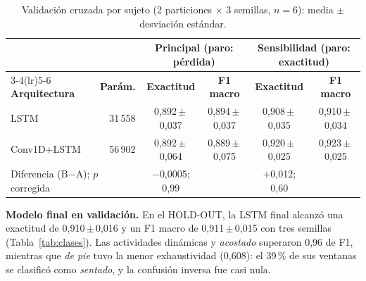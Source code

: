 \documentclass[runningheads]{llncs}
\newcommand{\pmv}[2]{#1\,{\scriptsize$\pm$\,#2}}   %
\begin{document}
\begin{table}[!b]
\centering
\caption{Validación cruzada por sujeto (2 particiones $\times$ 3 semillas, $n=6$):
media $\pm$ desviación estándar.}\label{tab:cv}
\footnotesize
\begin{tabular}{lrcccc}
\toprule
 & & \multicolumn{2}{c}{Principal (paro: pérdida)} & \multicolumn{2}{c}{Sensibilidad (paro: exactitud)}\\
\cmidrule(lr){3-4}\cmidrule(lr){5-6}
\textbf{Arquitectura} & \textbf{Parám.} & \textbf{Exactitud} & \textbf{F1 macro} & \textbf{Exactitud} & \textbf{F1 macro}\\
\midrule
LSTM        & 31\,558 & \pmv{0,892}{0,037} & \pmv{0,894}{0,037} & \pmv{0,908}{0,035} & \pmv{0,910}{0,034}\\
Conv1D+LSTM & 56\,902 & \pmv{0,892}{0,064} & \pmv{0,889}{0,075} & \pmv{0,920}{0,025} & \pmv{0,923}{0,025}\\
\midrule
\multicolumn{2}{l}{Diferencia (B$-$A); $p$ corregida} & $-$0,0005; 0,99 & & $+$0,012; 0,60 & \\
\bottomrule
\end{tabular}
\end{table}

\textbf{Modelo final en validación.} En el HOLD-OUT, la LSTM final alcanzó una
exactitud de 0,910\,$\pm$\,0,016 y un F1 macro de 0,911\,$\pm$\,0,015 con tres
semillas (Tabla~\ref{tab:clases}). %
Las actividades dinámicas y \emph{acostado} superaron 0,96 de F1, mientras que
\emph{de pie} tuvo la menor exhaustividad (0,608): el 39\,\% de sus ventanas se
clasificó como \emph{sentado}, y la confusión inversa fue casi nula.
\end{document}
